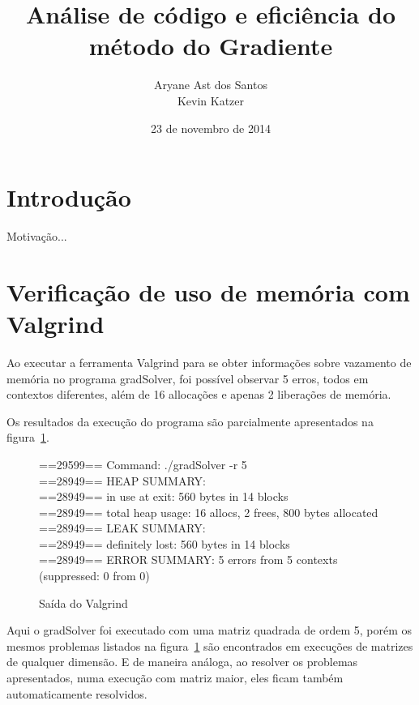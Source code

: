 \documentclass[12pt]{article}
\begin{document}
\setlength{\parskip}{0.2cm}

\title{Análise de código e eficiência do método do Gradiente}

\author{Aryane Ast dos Santos\\ Kevin Katzer}

\date{23 de novembro de 2014}

\maketitle

\tableofcontents

\section{Introdução}
Motivação...

\section{Verificação de uso de memória com Valgrind}\label{sec:Valgrind}

Ao executar a ferramenta Valgrind para se obter informações sobre vazamento de
memória no programa gradSolver, foi possível observar 5 erros, todos em
contextos diferentes, além de 16 allocações e apenas 2 liberações de memória.

Os resultados da execução do programa são parcialmente apresentados na
figura~\ref{fig:valgrindOut}.

\begin{figure}[htb]
\begin{tt}\noindent
==29599== Command: ./gradSolver -r 5\\
==28949== HEAP SUMMARY:\\
==28949==     in use at exit: 560 bytes in 14 blocks\\
==28949==   total heap usage: 16 allocs, 2 frees, 800 bytes allocated\\
==28949== LEAK SUMMARY:\\
==28949==    definitely lost: 560 bytes in 14 blocks\\
==28949== ERROR SUMMARY: 5 errors from 5 contexts (suppressed: 0 from 0)
\end{tt}\caption{Saída do Valgrind}\label{fig:valgrindOut}
\end{figure}

Aqui o gradSolver foi executado com uma matriz quadrada de ordem 5, porém os
mesmos problemas listados na figura~\ref{fig:valgrindOut} são encontrados em
execuções de matrizes de qualquer dimensão. E de maneira análoga, ao resolver os
problemas apresentados, numa execução com matriz maior, eles ficam também
automaticamente resolvidos.
\end{document}
